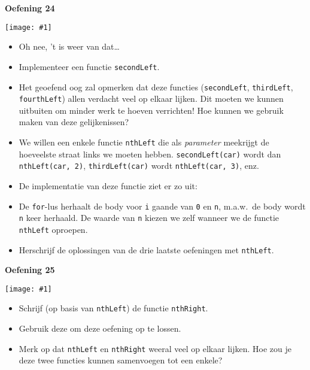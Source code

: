 \documentclass[a4paper]{article}
\newcommand{\newexercise}[1]{\clearpage\begin{center}\Huge\bf #1\end{center}}
\newcommand{\exercisemap}[1]{\begin{center}\texttt{[image: \#1]}\end{center}}
\newcommand{\code}[1]{
  \begin{center}
    \begin{minipage}{.8\linewidth}
      
    \end{minipage}
  \end{center}
}
\begin{document}
\newexercise{Oefening 24}
\exercisemap{ex24}
\begin{itemize}
  \item Oh nee, 't is weer van dat\dots
  \item Implementeer een functie \verb'secondLeft'.
  \item Het geoefend oog zal opmerken dat deze functies (\verb'secondLeft', \verb'thirdLeft', \verb'fourthLeft')
        allen verdacht veel op elkaar lijken. Dit moeten we kunnen uitbuiten om minder werk te hoeven verrichten!
        Hoe kunnen we gebruik maken van deze gelijkenissen?
  \item We willen een enkele functie \verb'nthLeft' die als \emph{parameter} meekrijgt
        de hoeveelste straat links we moeten hebben. \verb'secondLeft(car)' wordt
        dan \verb'nthLeft(car, 2)', \verb'thirdLeft(car)' wordt \verb'nthLeft(car, 3)', enz.
  \item De implementatie van deze functie ziet er zo uit:
        \code{nthleft.js}
  \item De \verb'for'-lus herhaalt de body voor \verb'i' gaande van \verb'0' en \verb'n', m.a.w.\
        de body wordt \verb'n' keer herhaald. De waarde van \verb'n' kiezen we zelf wanneer
        we de functie \verb'nthLeft' oproepen.
  \item Herschrijf de oplossingen van de drie laatste oefeningen met \verb'nthLeft'.
\end{itemize}


\newexercise{Oefening 25}
\exercisemap{ex25}
\begin{itemize}
  \item Schrijf (op basis van \verb'nthLeft') de functie \verb'nthRight'.
  \item Gebruik deze om deze oefening op te lossen.
  \item Merk op dat \verb'nthLeft' en \verb'nthRight' weeral veel op elkaar lijken.
        Hoe zou je deze twee functies kunnen samenvoegen tot een enkele?
\end{itemize}
\end{document}
